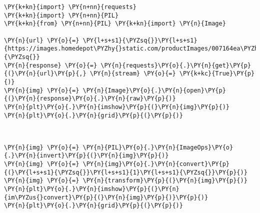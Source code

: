     \begin{tcolorbox}[breakable, size=fbox, boxrule=1pt, pad at break*=1mm,colback=cellbackground, colframe=cellborder]
\begin{Verbatim}[commandchars=\\\{\}]
\PY{k+kn}{import} \PY{n+nn}{requests}
\PY{k+kn}{import} \PY{n+nn}{PIL}
\PY{k+kn}{from} \PY{n+nn}{PIL} \PY{k+kn}{import} \PY{n}{Image}

\PY{n}{url} \PY{o}{=} \PY{l+s+s1}{\PYZsq{}}\PY{l+s+s1}{https://images.homedepot\PYZhy{}static.com/productImages/007164ea\PYZhy{}d47e\PYZhy{}4f66\PYZhy{}8d8c\PYZhy{}fd9f621984a2/svn/architectural\PYZhy{}mailboxes\PYZhy{}house\PYZhy{}letters\PYZhy{}numbers\PYZhy{}3585b\PYZhy{}5\PYZhy{}64\PYZus{}1000.jpg}\PY{l+s+s1}{\PYZsq{}}
\PY{n}{response} \PY{o}{=} \PY{n}{requests}\PY{o}{.}\PY{n}{get}\PY{p}{(}\PY{n}{url}\PY{p}{,} \PY{n}{stream} \PY{o}{=} \PY{k+kc}{True}\PY{p}{)}
\PY{n}{img} \PY{o}{=} \PY{n}{Image}\PY{o}{.}\PY{n}{open}\PY{p}{(}\PY{n}{response}\PY{o}{.}\PY{n}{raw}\PY{p}{)}
\PY{n}{plt}\PY{o}{.}\PY{n}{imshow}\PY{p}{(}\PY{n}{img}\PY{p}{)}
\PY{n}{plt}\PY{o}{.}\PY{n}{grid}\PY{p}{(}\PY{p}{)}
\end{Verbatim}
\end{tcolorbox}

    \begin{center}
    \end{center}
    { \hspace*{\fill} \\}
    
    \begin{tcolorbox}[breakable, size=fbox, boxrule=1pt, pad at break*=1mm,colback=cellbackground, colframe=cellborder]
\begin{Verbatim}[commandchars=\\\{\}]
\PY{n}{img} \PY{o}{=} \PY{n}{PIL}\PY{o}{.}\PY{n}{ImageOps}\PY{o}{.}\PY{n}{invert}\PY{p}{(}\PY{n}{img}\PY{p}{)}
\PY{n}{img} \PY{o}{=} \PY{n}{img}\PY{o}{.}\PY{n}{convert}\PY{p}{(}\PY{l+s+s1}{\PYZsq{}}\PY{l+s+s1}{1}\PY{l+s+s1}{\PYZsq{}}\PY{p}{)}
\PY{n}{img} \PY{o}{=} \PY{n}{transform}\PY{p}{(}\PY{n}{img}\PY{p}{)}
\PY{n}{plt}\PY{o}{.}\PY{n}{imshow}\PY{p}{(}\PY{n}{im\PYZus{}convert}\PY{p}{(}\PY{n}{img}\PY{p}{)}\PY{p}{)}
\PY{n}{plt}\PY{o}{.}\PY{n}{grid}\PY{p}{(}\PY{p}{)}
\end{Verbatim}
\end{tcolorbox}

